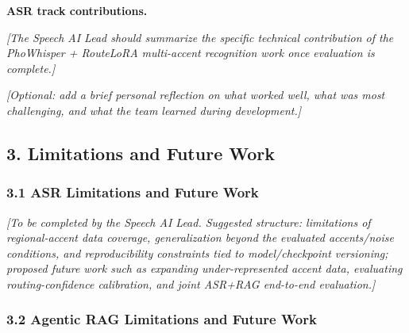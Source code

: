 \documentclass[11pt,a4paper]{article}
\newcommand{\guidance}[1]{%
  {\color{guidanceblue}\itshape [#1]\par}%
}
\begin{document}
\textbf{ASR track contributions.} \guidance{The Speech AI Lead should
summarize the specific technical contribution of the PhoWhisper +
RouteLoRA multi-accent recognition work once evaluation is complete.}

\guidance{Optional: add a brief personal reflection on what worked well,
what was most challenging, and what the team learned during development.}

\subsection{3. Limitations and Future Work}

\subsubsection{3.1 ASR Limitations and Future Work}
\guidance{To be completed by the Speech AI Lead. Suggested structure:
limitations of regional-accent data coverage, generalization beyond the
evaluated accents/noise conditions, and reproducibility constraints tied to
model/checkpoint versioning; proposed future work such as expanding
under-represented accent data, evaluating routing-confidence calibration,
and joint ASR+RAG end-to-end evaluation.}

\subsubsection{3.2 Agentic RAG Limitations and Future Work}
\end{document}
